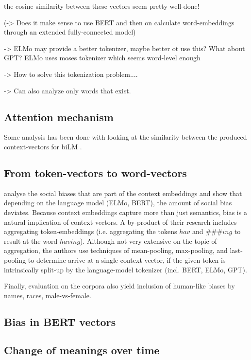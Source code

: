\documentclass[a4paper,12pt,twoside,openright]{report}
\begin{document}
the cosine similarity between these vectors seem pretty well-done!


(-> Does it make sense to use BERT and then on calculate word-embeddings through an extended fully-connected model)

-> ELMo may provide a better tokenizer, maybe better ot use this? What about GPT? ELMo uses moses tokenizer which seems word-level enough

-> How to solve this tokenization problem....

-> Can also analyze only words that exist.

\subsection{Attention mechanism}

Some analysis has been done with looking at the similarity between the produced context-vectors for biLM \cite{peters18}.

\subsection{From token-vectors to word-vectors}

\cite{may19} analyse the social biases that are part of the context embeddings and show that depending on the language model (ELMo, BERT), the amount of social bias deviates. 
Because context embeddings capture more than just semantics, bias is a natural implication of context vectors.
A by-product of their research includes aggregating token-embeddings (i.e. aggregating the tokens $hav$ and $\#\#\#ing$ to result at the word $having$).
Although not very extensive on the topic of aggregation, the authors  use techniques of mean-pooling, max-pooling, and last-pooling to determine arrive at a single context-vector, if the given token is intrinsically split-up by the language-model tokenizer (incl. BERT, ELMo, GPT).

Finally, evaluation on the corpora also yield inclusion of human-like biases \cite{jentzsch19} by names, races, male-vs-female.

\subsection{Bias in BERT vectors}


\subsection{Change of meanings over time}
\end{document}
